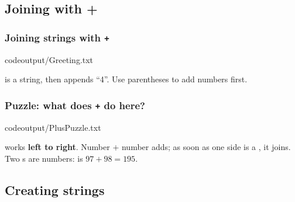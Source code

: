 \documentclass[aspectratio=169,10pt,compress]{beamer}
\begin{document}


\subsection[Plus]{Joining with +}




\begin{frame}[t,fragile] \frametitle{Joining strings with \texttt{+}}
			{codeoutput/Greeting.txt}

	\vspace{0.3em}
	\small {} 
	 is a string, 
	then  appends ``4''.
	Use parentheses to add numbers first.
\end{frame}




\begin{frame}[t,fragile] \frametitle{Puzzle: what does \texttt{+} do here?}
			{codeoutput/PlusPuzzle.txt}

	\vspace{0.3em}
	\small \hCode{+} works \textbf{left to right}. 
	Number $+$ number adds; 
	as soon as one side is a , it joins.
	Two s are numbers:  is $97 + 98 = 195$.
\end{frame}







\subsection[Create]{Creating strings}
\end{document}
